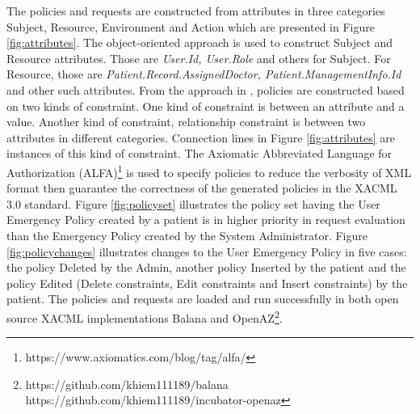 \documentclass[conference]{IEEEtran}
\begin{document}
The policies and requests are constructed from attributes in three categories Subject, Resource, Environment and Action which are presented in Figure \ref{fig:attributes}.
The object-oriented approach is used to construct Subject and Resource attributes.
Those are \textit{User.Id, User.Role} and others for Subject. 
For Resource, those are \textit{Patient.Record.AssignedDoctor, Patient.ManagementInfo.Id} and other such attributes.
From the approach in \cite{medvet2015evolutionary}, policies are constructed based on two kinds of constraint.
One kind of constraint is between an attribute and a value.
Another kind of constraint, relationship constraint is between two attributes in different categories.
Connection lines in Figure \ref{fig:attributes} are instances of this kind of constraint.
The Axiomatic Abbreviated Language for Authorization (ALFA)\footnote{https://www.axiomatics.com/blog/tag/alfa/} is used to specify policies to reduce the verbosity of XML format then guarantee the correctness of the generated policies in the XACML 3.0 standard.
Figure \ref{fig:policyset} illustrates the policy set having the User Emergency Policy created by a patient is in higher priority in request evaluation than the Emergency Policy created by the System Administrator.
Figure \ref{fig:policychanges} illustrates changes to the User Emergency Policy in five cases: the policy Deleted by the Admin, another policy Inserted by the patient and the policy Edited (Delete constraints, Edit constraints and Insert constraints) by the patient.
The policies and requests are loaded and run successfully in both open source XACML implementations Balana and OpenAZ\footnote{https://github.com/khiem111189/balana\\https://github.com/khiem111189/incubator-openaz}.
\end{document}
